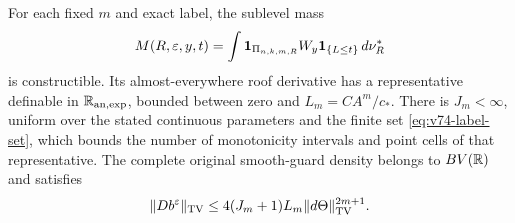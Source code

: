 \begin{theorem}
\label{thm:v74-tame-family}
For each fixed $m$ and exact label, the sublevel mass
\begin{equation}\label{eq:v74-sublevel-mass}
 M(R,\varepsilon,y,t)
  =\int \one_{\Pi_{n,k,m,R}}W_y\one_{\{L\le t\}}\,d\nu_R^*
\end{equation}
is constructible. Its almost-everywhere roof derivative has a
representative definable in $\mathbb R_{\mathrm{an},\exp}$, bounded between
zero and $L_m=CA^m/c_*$. There is $J_m<\infty$, uniform over the
stated continuous parameters and the finite set \eqref{eq:v74-label-set},
which bounds the number of monotonicity intervals and point cells
of that representative. The complete original smooth-guard density
belongs to $BV(\mathbb R)$ and satisfies
\begin{equation}\label{eq:v74-bv}
 \|Db^\varepsilon\|_{\TV}
 \le4(J_m+1)L_m\|d\Theta\|_{\TV}^{2m+1}.
\end{equation}
\end{theorem}
